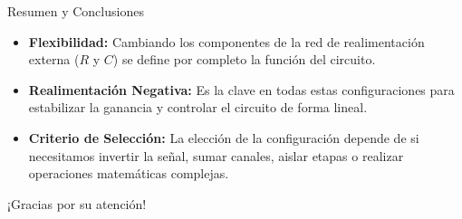 \documentclass{beamer}
\begin{document}
\begin{frame}{Resumen y Conclusiones}
    \begin{itemize}
        \item \textbf{Flexibilidad:} Cambiando los componentes de la red de realimentación externa ($R$ y $C$) se define por completo la función del circuito.
        \item \textbf{Realimentación Negativa:} Es la clave en todas estas configuraciones para estabilizar la ganancia y controlar el circuito de forma lineal.
        \item \textbf{Criterio de Selección:} La elección de la configuración depende de si necesitamos invertir la señal, sumar canales, aislar etapas o realizar operaciones matemáticas complejas.
    \end{itemize}
    \vspace{0.5cm}
    \centering
    \color{blue}\Large ¡Gracias por su atención!
\end{frame}
\end{document}
